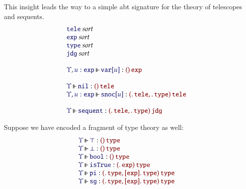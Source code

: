 \documentclass[11pt]{article}
\theoremstyle{definition}
\theoremstyle{remark}
\numberwithin{equation}{section}
\def\IModeColorName{MidnightBlue}
\def\OModeColorName{Maroon}
\newcommand\IMode[1]{{\color{\IModeColorName}{#1}}}
\newcommand\OMode[1]{{\color{\OModeColorName}{#1}}}
\newcommand\MkValence[3]{%
  \ifthenelse{\equal{#1}{}}{}{%
    \{#1\}%
  }%
  \ifthenelse{\equal{#2}{}}{}{%
    [#2]%
  }.\, #3%
}
\newcommand\MkArity[2]{(#1)\, #2}
\newcommand\IsSort[1]{\IMode{#1}\ \textit{sort}}
\newcommand\IsOperator[3]{
  \IMode{#1}\,{\Vdash}\,\IMode{#2}: \OMode{#3}
}
\newcommand\SortExp{\mathtt{exp}}
\begin{document}
This insight leads the way to a simple abt signature for the theory of telescopes
and sequents.
%
\newcommand\SortTele{\mathtt{tele}}
\newcommand\SortJdg{\mathtt{jdg}}
\newcommand\SortType{\mathtt{type}}
\newcommand\SortExpr{\mathtt{exp}}
\newcommand\OpNil{\mathtt{nil}}
\newcommand\OpSnoc[1]{\mathtt{snoc}[#1]}
\newcommand\OpVar[1]{\mathtt{var}[#1]}
\newcommand\OpSequent{\mathtt{sequent}}
%
\[
  \begin{array}{l}
    \IsSort{\SortTele}\\
    \IsSort{\SortExpr}\\
    \IsSort{\SortType}\\
    \IsSort{\SortJdg}\\\\
    \IsOperator{\Upsilon, u:\SortExpr}{\OpVar{u}}{
      \MkArity{}{\SortExpr}
    }\\\\
    \IsOperator{\Upsilon}{\OpNil}{
      \MkArity{}{\SortTele}
    }\\
    \IsOperator{\Upsilon, u:\SortExpr}{\OpSnoc{u}}{
      \MkArity{
        \MkValence{}{}{\SortTele},
        \MkValence{}{}{\SortType}
      }{\SortTele}
    }\\\\
    \IsOperator{\Upsilon}{\OpSequent}{
      \MkArity{
        \MkValence{}{}{\SortTele},
        \MkValence{}{}{\SortType}
      }{\SortJdg}
    }
  \end{array}
\]

\newcommand\OpPi{\mathtt{pi}}
\newcommand\OpSg{\mathtt{sg}}
\newcommand\OpBool{\mathtt{bool}}
\newcommand\OpSo{\mathtt{isTrue}}

Suppose we have encoded a fragment of type theory as well:
\[
  \begin{array}{l}
    \IsOperator{\Upsilon}{\top}{
      \MkArity{}{\SortType}
    }\\
    \IsOperator{\Upsilon}{\bot}{
      \MkArity{}{\SortType}
    }\\
    \IsOperator{\Upsilon}{\OpBool}{
      \MkArity{}{\SortType}
    }\\
    \IsOperator{\Upsilon}{\OpSo}{
      \MkArity{
        \MkValence{}{}{\SortExp}
      }{\SortType}
    }\\
    \IsOperator{\Upsilon}{\OpPi}{
      \MkArity{
        \MkValence{}{}{\SortType},
        \MkValence{}{\SortExp}{\SortType}
      }{\SortType}
    }\\
    \IsOperator{\Upsilon}{\OpSg}{
      \MkArity{
        \MkValence{}{}{\SortType},
        \MkValence{}{\SortExp}{\SortType}
      }{\SortType}
    }\\
  \end{array}
\]
\end{document}
